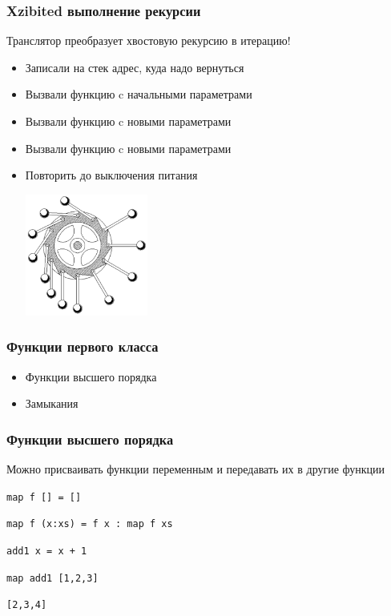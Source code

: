 \documentclass{beamer}
\begin{document}
\begin{frame}
  \frametitle{Xzibited выполнение рекурсии}
  Транслятор преобразует хвостовую рекурсию в итерацию!
  \pause
  \begin{itemize}
  \item Записали на стек адрес, куда надо вернуться
    \pause
  \item Вызвали функцию c начальными параметрами
    \pause
  \item Вызвали функцию c новыми параметрами
    \pause
  \item Вызвали функцию c новыми параметрами
    \pause
  \item Повторить до выключения питания
    \begin{center}
      \includegraphics[height=4cm]{perpetuum.png}
    \end{center}
  \end{itemize}
\end{frame}

\begin{frame}
  \frametitle{Функции первого класса}
  \begin{itemize}
  \item Функции высшего порядка
    \pause
  \item Замыкания
  \end{itemize}
\end{frame}

\begin{frame}
  \frametitle{Функции высшего порядка}
  Можно присваивать функции переменным и передавать их в другие функции
  \begin{block}{}
    \texttt{{\color{blue}map} f [] = []}

    \texttt{{\color{blue}map} f (x:xs) = f x : map f xs}
    \pause

    \texttt{{\color{blue}add1} x = x + 1}
    \pause

    \texttt{{\color{blue}map} add1 [1,2,3]}

    \texttt{[2,3,4]}
  \end{block}
\end{frame}
\end{document}

